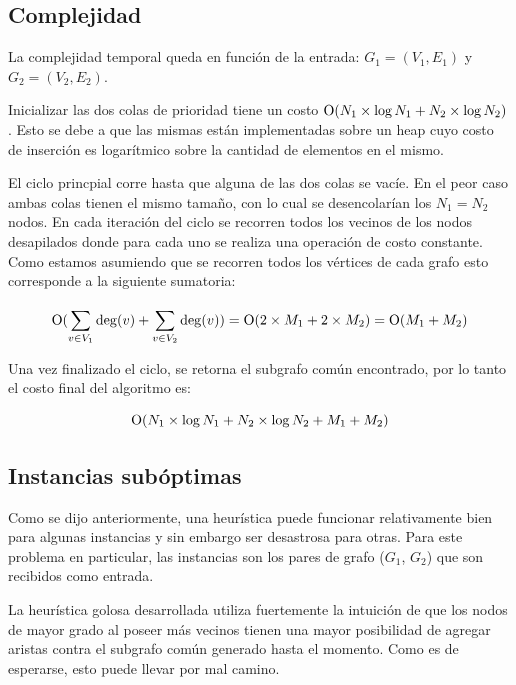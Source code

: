 \subsection{Complejidad}

La complejidad temporal queda en función de la entrada: $G_1 = (V_1, E_1)$ y $G_2 = (V_2,
E_2)$.

Inicializar las dos colas de prioridad tiene un costo $\operatorname{O}(N_1 \times \log N_1 + N_2
\times \log N_2)$. Esto se debe a que las mismas están implementadas sobre un heap cuyo costo
de inserción es logarítmico sobre la cantidad de elementos en el mismo.

El ciclo princpial corre hasta que alguna de las dos colas se vacíe. En el peor caso
ambas colas tienen el mismo tamaño, con lo cual se desencolarían los $N_1 = N_2$
nodos. En cada iteración del ciclo se recorren todos los vecinos de los nodos
desapilados donde para cada uno se realiza una operación de costo constante.
Como estamos asumiendo que se recorren todos los vértices de cada grafo esto
corresponde a la siguiente sumatoria:

\begin{equation*}
	\operatorname{O}(\sum_{v \in V_1}^{} \deg(v) + \sum_{v \in V_2}^{} \deg(v)) =
	\operatorname{O}(2 \times M_1 + 2 \times M_2) = \operatorname{O}(M_1 + M_2)
\end{equation*}

Una vez finalizado el ciclo, se retorna el subgrafo común encontrado, por lo
tanto el costo final del algoritmo es:

\begin{equation*}
	\operatorname{O}(N_1 \times \log N_1 + N_2 \times \log N_2 + M_1 + M_2)
\end{equation*}

\subsection{Instancias subóptimas}\label{sec:ej4:suboptimal}

Como se dijo anteriormente, una heurística puede funcionar relativamente bien
para algunas instancias y sin embargo ser desastrosa para otras. Para este
problema en particular, las instancias son los pares de grafo ($G_1$, $G_2$) que
son recibidos como entrada.

La heurística golosa desarrollada utiliza fuertemente la intuición de que los
nodos de mayor grado al poseer más vecinos tienen una mayor posibilidad de
agregar aristas contra el subgrafo común generado hasta el momento. Como es de
esperarse, esto puede llevar por mal camino.

